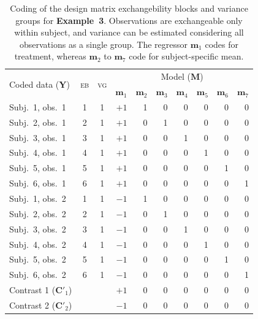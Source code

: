 \begin{table}[!t]
\caption[Coding for Example 3]{Coding of the design matrix exchangebility blocks and variance groups for \textbf{Example~3}. Observations are exchangeable only within subject, and variance can be estimated considering all observations as a single group. The regressor $\mathbf{m}_1$ codes for treatment, whereas $\mathbf{m}_2$ to $\mathbf{m}_7$ code for subject-specific mean.}
\begin{center}
{\small
\begin{tabular}{@{}lccrrrrrrr@{}}
\toprule
\multirow{2}{*}{\vspace*{-1.7mm}Coded data ($\mathbf{Y}$)} & \multirow{2}{*}{\vspace*{-1.7mm}\textsc{eb}} & \multirow{2}{*}{\vspace*{-1.7mm}\textsc{vg}} & \multicolumn{7}{c}{Model ($\mathbf{M}$)\hspace*{-3mm}}\\
\cmidrule(l){4-10}
& & & $\mathbf{m}_1$ & $\mathbf{m}_2$ & $\mathbf{m}_3$ & $\mathbf{m}_4$& $\mathbf{m}_5$ & $\mathbf{m}_6$ & $\mathbf{m}_7$\\
\midrule
Subj.\ 1, obs.\ 1  & 1 & 1 & $+1$ & 1 & 0 & 0 & 0 & 0 & 0\\
Subj.\ 2, obs.\ 1  & 2 & 1 & $+1$ & 0 & 1 & 0 & 0 & 0 & 0\\
Subj.\ 3, obs.\ 1  & 3 & 1 & $+1$ & 0 & 0 & 1 & 0 & 0 & 0\\
Subj.\ 4, obs.\ 1  & 4 & 1 & $+1$ & 0 & 0 & 0 & 1 & 0 & 0\\
Subj.\ 5, obs.\ 1  & 5 & 1 & $+1$ & 0 & 0 & 0 & 0 & 1 & 0\\
Subj.\ 6, obs.\ 1  & 6 & 1 & $+1$ & 0 & 0 & 0 & 0 & 0 & 1\\
Subj.\ 1, obs.\ 2  & 1 & 1 & $-1$ & 1 & 0 & 0 & 0 & 0 & 0\\
Subj.\ 2, obs.\ 2  & 2 & 1 & $-1$ & 0 & 1 & 0 & 0 & 0 & 0\\ 
Subj.\ 3, obs.\ 2  & 3 & 1 & $-1$ & 0 & 0 & 1 & 0 & 0 & 0\\ 
Subj.\ 4, obs.\ 2  & 4 & 1 & $-1$ & 0 & 0 & 0 & 1 & 0 & 0\\
Subj.\ 5, obs.\ 2  & 5 & 1 & $-1$ & 0 & 0 & 0 & 0 & 1 & 0\\
Subj.\ 6, obs.\ 2  & 6 & 1 & $-1$ & 0 & 0 & 0 & 0 & 0 & 1\\
\midrule
Contrast 1 ($\mathbf{C}'_1$) & & & $+1$ & 0 & 0 & 0 & 0 & 0 & 0\\
Contrast 2 ($\mathbf{C}'_2$) & & & $-1$ & 0 & 0 & 0 & 0 & 0 & 0\\
\bottomrule
\end{tabular}}
\end{center}
\label{tab:perm:ex_pairedttest}
\end{table}

